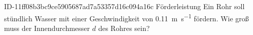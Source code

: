 \begin{exercise}
      {ID-11ff08b3bc9ce5905687ad7a53357d16c094a16c}
      {Förderleistung}
  \ifproblem\problem
    Ein Rohr soll stündlich  Wasser mit einer Geschwindigkeit von
    \SI{0.11}{\metre\per\second} fördern. Wie groß muss der Innendurchmesser
    $d$ des Rohres sein?
  \fi
\end{exercise}
